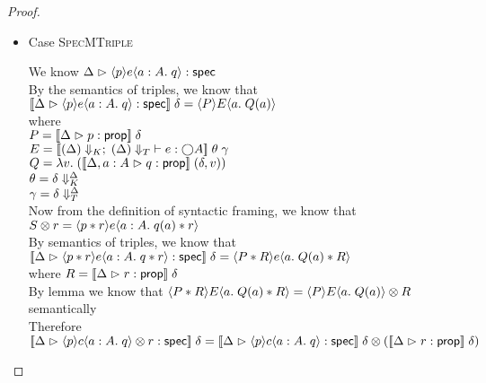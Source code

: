 \begin{proof}
\begin{itemize}
  \item Case \textsc{SpecMTriple}
    \begin{tabbedproof}
      \oo We know $\judgeS{\mspec{p}{e}{a:A}{q}}$ \\
      \oo By the semantics of triples, we know that 
          $\interp{\judgeS{\mspec{p}{e}{a:A}{q}}}\;\delta = \mspec{P}{E}{a}{Q(a)}$ \\ 
      \ox where \\
      \oox $P = \interp{\judgeA{p}{\assert}}\;\delta$ \\
      \oox $E = \interp{\judgeE[\restrictkind{\Delta}]{\restricttype{\Delta}}{e}{\monad{A}}}\;\theta\;\gamma$ \\
      \oox $Q = \semfun{v}{(\interp{\judgeA[\Delta, a:A]{q}{\assert}}\;(\delta, v))}$ \\
      \oox $\theta = \restricttyenv{\Delta}{\delta}$ \\
      \oox $\gamma = \restrictvals{\Delta}{\delta}$ \\
      \oo Now from the definition of syntactic framing, we know that $\Frame{S}{r} = \mspec{p * r}{e}{a:A}{q(a) * r}$ \\
      \oo By semantics of triples, we know that \\
      \oox $\interp{\judgeS{\mspec{p * r}{e}{a:A}{q * r}}}\;\delta = \mspec{P * R}{e}{a}{Q(a) * R}$ \\ 
      \ox where $R = \interp{\judgeA{r}{\assert}}\;\delta$ \\
      \oo By lemma we know that $\mspec{P * R}{E}{a}{Q(a) * R} = \Frame{\mspec{P}{E}{a}{Q(a)}}{R}$ 
          semantically \\
      \oo Therefore $\interp{\judgeS{\Frame{\mspec{p}{c}{a:A}{q}}{r}}}\;\delta = 
                     \Frame{\interp{\judgeS{\mspec{p}{c}{a:A}{q}}}\;\delta}{(\interp{\judgeA{r}{\assert}}\;\delta)}$
    \end{tabbedproof}


\end{itemize}
\end{proof}
